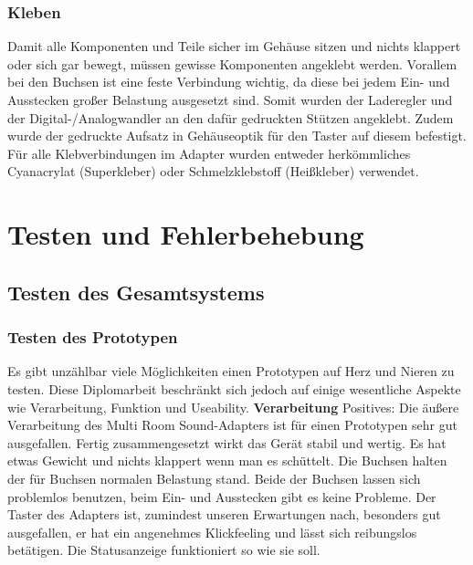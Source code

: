 \documentclass[]{article}
\begin{document}
\subsubsection{Kleben}
Damit alle Komponenten und Teile sicher im Gehäuse sitzen und nichts klappert oder sich gar bewegt, müssen gewisse Komponenten angeklebt werden. Vorallem bei den Buchsen ist eine feste Verbindung wichtig, da diese bei jedem Ein- und Ausstecken großer Belastung ausgesetzt sind. Somit wurden der Laderegler und der Digital-/Analogwandler an den dafür gedruckten Stützen angeklebt. Zudem wurde der gedruckte Aufsatz in Gehäuseoptik für den Taster auf diesem befestigt. Für alle Klebverbindungen im Adapter wurden entweder herkömmliches Cyanacrylat (Superkleber) oder Schmelzklebstoff (Heißkleber) verwendet.

\section{Testen und Fehlerbehebung}
\subsection{Testen des Gesamtsystems}
\subsubsection{Testen des Prototypen}
Es gibt unzählbar viele Möglichkeiten einen Prototypen auf Herz und Nieren zu testen. Diese Diplomarbeit beschränkt sich jedoch auf einige wesentliche Aspekte wie Verarbeitung, Funktion und Useability.
\vspace{4mm}\newline
\textbf{Verarbeitung}
\vspace{4mm}\newline
Positives:\newline
Die äußere Verarbeitung des Multi Room Sound-Adapters ist für einen Prototypen sehr gut ausgefallen. Fertig zusammengesetzt wirkt das Gerät stabil und wertig. Es hat etwas Gewicht und nichts klappert wenn man es schüttelt. Die Buchsen halten der für Buchsen normalen Belastung stand. Beide der Buchsen lassen sich problemlos benutzen, beim Ein- und Ausstecken gibt es keine Probleme. Der Taster des Adapters ist, zumindest unseren Erwartungen nach, besonders gut ausgefallen, er hat ein angenehmes Klickfeeling und lässt sich reibungslos betätigen. Die Statusanzeige funktioniert so wie sie soll.
\end{document}

